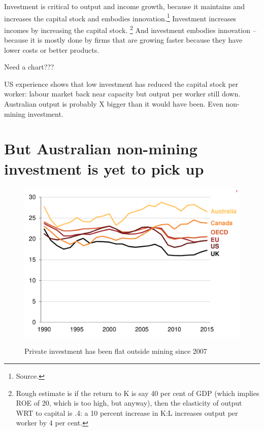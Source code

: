 Investment is critical to output and income growth, because it maintains and increases the capital stock and embodies innovation.\footnote{Source.} Investment increases incomes by increasing the capital stock. \footnote{Rough estimate is if the return to K is say 40 per cent of GDP (which implies ROE of 20, which is too high, but anyway), then the elasticity of output WRT to capital is .4: a 10 percent increase in K:L increases output per worker by 4 per cent.} And investment embodies innovation -- because it is mostly done by firms that are growing faster because they have lower costs or better products. 

Need a chart???

US experience shows that low investment has reduced the capital stock per worker: labour market back near capacity but output per worker still down.  Australian output is probably X bigger than it would have been. Even non-mining investment. 



\section{But Australian non-mining investment is yet to pick up}

\begin{figure}[p] 
 \caption{Private investment has been flat outside mining since 2007}
 \includegraphics[page=3]{atlas/Ch2.pdf}\label{fig:privatecap}

\end{figure}

